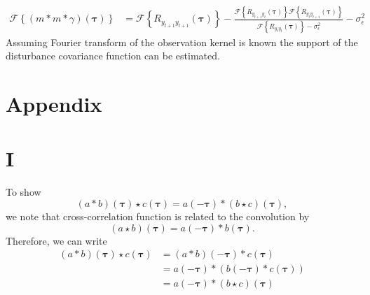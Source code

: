 \documentclass[]{article}
\begin{document}
\begin{align}
 \mathcal F\left\lbrace (m\ast m \ast \gamma)(\boldsymbol\tau)\right\rbrace&= \mathcal F\left\lbrace R_{y_{t+1}y_{t+1}}(\boldsymbol{\tau})\right\rbrace-\frac{\mathcal F\left\lbrace R_{y_{t+1}y_t}(\boldsymbol{\tau})\right\rbrace \mathcal F \left\lbrace R_{y_{t}y_{t+1}}(\boldsymbol{\tau})\right\rbrace}{\mathcal F \left\lbrace R_{y_ty_t}(\boldsymbol{\tau})\right\rbrace-\sigma_{\epsilon}^2}-\sigma_{\epsilon}^2
\end{align}
Assuming Fourier transform of the observation kernel is known the support of the disturbance covariance function can be estimated.
\section*{Appendix}
\appendix
\section*{I}
To show 
\begin{equation}
 \left(a \ast b \right)\left(\boldsymbol\tau\right)  \star c\left(\boldsymbol\tau\right)  = a\left(-\boldsymbol\tau\right)\ast\left(b \star c\right)\left(\boldsymbol\tau\right),
\end{equation}
we note that cross-correlation function is related to the convolution by \cite{Yarlagadda2009}
\begin{equation}
 \left(a \star b\right)\left(\boldsymbol\tau\right)= a\left(-\boldsymbol\tau \right)\ast b\left(\boldsymbol\tau\right).
\end{equation}
Therefore, we can write
\begin{align}
 \left(a \ast b\right)\left(\boldsymbol\tau\right) \star c\left(\boldsymbol\tau\right)&= \left(a \ast b\right)\left(-\boldsymbol\tau \right)\ast c\left(\boldsymbol\tau\right) \nonumber \\
&=a\left(-\boldsymbol\tau\right)\ast \left(b\left(-\boldsymbol\tau\right) \ast c\left(\boldsymbol\tau\right)\right)\nonumber \\
&=a\left(-\boldsymbol\tau\right)\ast\left(b\star c\right)\left(\boldsymbol\tau\right)
\end{align}
\end{document}
